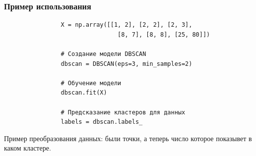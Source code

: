 			
		\subsubsection{Пример использования}
			\begin{verbatim}
				X = np.array([[1, 2], [2, 2], [2, 3],
              					[8, 7], [8, 8], [25, 80]])

				# Создание модели DBSCAN
				dbscan = DBSCAN(eps=3, min_samples=2)

				# Обучение модели
				dbscan.fit(X)

				# Предсказание кластеров для данных
				labels = dbscan.labels_
			\end{verbatim}
			
			
			Пример преобразования данных:
				были точки, а теперь число которое показывет в каком кластере.
	
	







